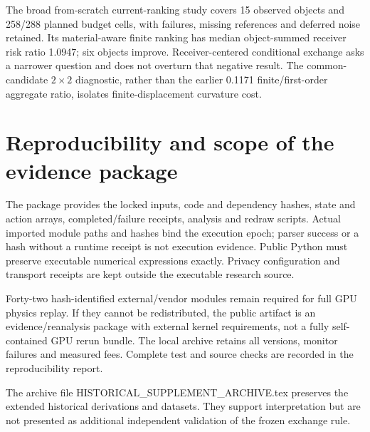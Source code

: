 \documentclass[11pt]{article}
\begin{document}
The broad from-scratch current-ranking study covers 15 observed objects and 258/288 planned budget cells, with failures, missing references and deferred noise retained. Its material-aware finite ranking has median object-summed receiver risk ratio 1.0947; six objects improve. Receiver-centered conditional exchange asks a narrower question and does not overturn that negative result. The common-candidate $2\times2$ diagnostic, rather than the earlier 0.1171 finite/first-order aggregate ratio, isolates finite-displacement curvature cost.

\section{Reproducibility and scope of the evidence package}
The package provides the locked inputs, code and dependency hashes, state and action arrays, completed/failure receipts, analysis and redraw scripts. Actual imported module paths and hashes bind the execution epoch; parser success or a hash without a runtime receipt is not execution evidence. Public Python must preserve executable numerical expressions exactly. Privacy configuration and transport receipts are kept outside the executable research source.

Forty-two hash-identified external/vendor modules remain required for full GPU physics replay. If they cannot be redistributed, the public artifact is an evidence/reanalysis package with external kernel requirements, not a fully self-contained GPU rerun bundle. The local archive retains all versions, monitor failures and measured fees. Complete test and source checks are recorded in the reproducibility report.

The archive file HISTORICAL\_SUPPLEMENT\_ARCHIVE.tex preserves the extended historical derivations and datasets. They support interpretation but are not presented as additional independent validation of the frozen exchange rule.

\end{document}
